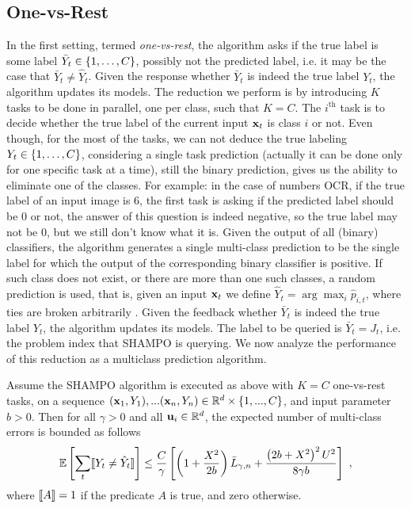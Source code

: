 \subsection{One-vs-Rest}
In the first setting, termed {\em one-vs-rest}, the algorithm asks if the true label is some label $\bar{Y}_t\in\{ 1 , \ldots , C\}$, possibly not the predicted label, i.e. it may be the case that $\bar{Y}_t \neq\hat{Y}_t$. Given the response whether  $\bar{Y}_t$ is indeed the true label $Y_t$, the algorithm updates its models. The reduction we perform is by introducing $K$ tasks to be done in parallel, one per class, such that $K=C$. The $i^{\text{th}}$ task is to decide whether the true label of the current input  $\mathbf{x}_t$ is class $i$ or not. Even though, for the most of the tasks, we can not deduce the true labeling $Y_t\in\{ 1 , \ldots , C\}$,  considering a single task prediction (actually it can be done only for one  specific task at a time),  still the binary prediction, gives us the ability to eliminate one of the classes. For example: in the case of numbers OCR, if the true label of an input image is $6$, the first task is asking if the predicted label should be $0$ or not, the answer of this question is indeed negative, so  the true label may not be $0$, but we still don't know what it is. Given the output of all (binary) classifiers, the algorithm generates a single multi-class prediction to be the single label for which the output of the corresponding binary classifier is positive.  If such class does not exist, or there are more than one such classes, a random prediction is used, that is, given an input $\mathbf{x}_{t}$ we define $\hat{Y}_t = \arg\max_i \hat{p}_{i,t}$, where ties are broken arbitrarily   . Given the feedback whether  $\bar{Y}_t$ is indeed the true label $Y_t$, the algorithm updates its models. The label to be queried is $\bar{Y}_t=J_t$, i.e. the problem index that SHAMPO is querying. We now analyze the performance of this reduction as a multiclass prediction algorithm.
\begin{corollary} 
Assume the SHAMPO algorithm is executed as above with $K=C$ one-vs-rest tasks, on a sequence $(\mathbf{x}_1,Y_1),...(\mathbf{x}_n,Y_n)\in\mathbb{R}^d\times\{1,...,C\}$, and input parameter $b>0$. Then for all $\gamma>0$ and all $\mathbf{u}_{i}\in\mathbb{R}^d$, the expected number of multi-class errors is bounded as follows
\begin{displaymath}
\mathbb{E}\left[{\sum_t [\![{Y_t \neq \hat{Y}_t}]\!]}\right]\le \frac{C}{\gamma}\left[{\left({1+\frac{X^2}{2b} }\right){\bar L}_{\gamma,n}+\frac{\left({{2b+X^2}}\right)^2U^2}{8{\gamma}b}}\right]~,
\end{displaymath}
where $[\![{A}]\!]=1$ if the predicate $A$ is true, and zero otherwise.
\end{corollary}
